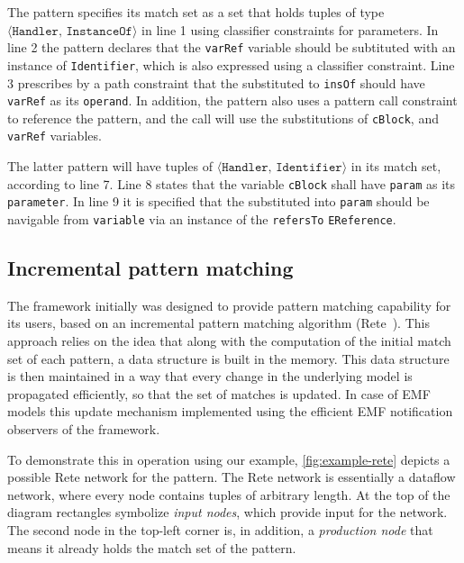 The \catchproblem pattern specifies its match set as a set that holds tuples of type $ \langle \texttt{Handler, InstanceOf} \rangle $ in line 1 using classifier constraints for parameters.  In line 2 the pattern declares that the \texttt{varRef} variable should be subtituted with an instance of \texttt{Identifier}, which is also expressed using a classifier constraint. Line 3 prescribes by a path constraint that the \eobject substituted to \texttt{insOf} should have \texttt{varRef} as its \texttt{operand}. In addition, the pattern also uses a pattern call constraint to reference the \handlervar pattern, and the call will use the substitutions of \texttt{cBlock}, and \texttt{varRef} variables.

The latter pattern will have tuples of $ \langle \texttt{Handler, Identifier} \rangle $ in its match set, according to line 7. Line 8 states that the variable \texttt{cBlock} shall have \texttt{param} as its \texttt{parameter}. In line 9 it is specified that the \eobject substituted into \texttt{param} should be navigable from \texttt{variable} via an instance of the \texttt{refersTo} \texttt{EReference}.




\subsection{Incremental pattern matching}

The \eiq framework initially was designed to provide pattern matching capability for its users, based on an incremental pattern matching algorithm (Rete~\cite{bergmann:thesis-queries}). This approach relies on the idea that along with the computation of the initial match set of each pattern, a data structure is built in the memory. This data structure is then maintained in a way that every change in the underlying model is propagated efficiently, so that the set of matches is updated. In case of EMF models this update mechanism implemented using the efficient EMF notification observers of the framework.

%

To demonstrate this in operation using our example, \autoref{fig:example-rete} depicts a possible  Rete network for the \catchproblem pattern. The Rete network is essentially a dataflow network, where every node contains tuples of arbitrary length. At the top of the diagram rectangles symbolize \emph{input nodes}, which provide input for the network. The second node in the top-left corner is, in addition, a \emph{production node} that means it already holds the match set of the \handlervar pattern. 

